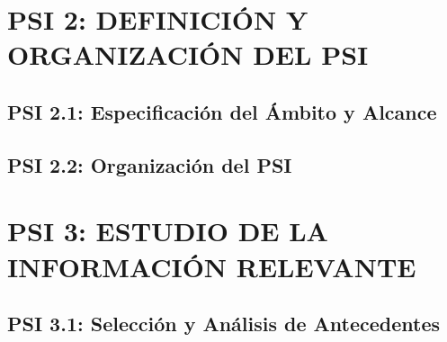 \newpage
\section{PSI 2: DEFINICIÓN Y ORGANIZACIÓN DEL PSI}
 

\subsection{PSI 2.1: Especificación del Ámbito y Alcance} 


\subsection{PSI 2.2: Organización del PSI}



\newpage
\section{PSI 3: ESTUDIO DE LA INFORMACIÓN RELEVANTE}
 
\subsection{PSI 3.1: Selección y Análisis de Antecedentes} 